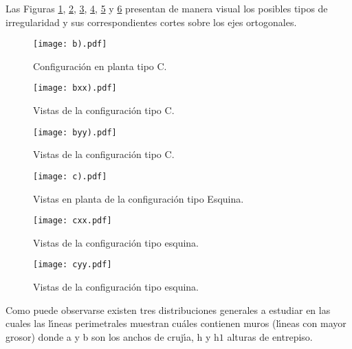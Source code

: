 Las Figuras \ref{fig:casosaf1}, \ref{fig:casosaf2}, \ref{fig:casosaf3}, \ref{fig:casosaf4}, \ref{fig:casosaf5} y \ref{fig:casosaf6} presentan de manera visual los posibles tipos de irregularidad y sus correspondientes cortes sobre los ejes ortogonales.  

\begin{figure} [htbp]
\centering
\texttt{[image: b).pdf]}
\caption{Configuraci\'on en planta tipo C.}
\label{fig:casosaf1}
\end{figure}

\begin{figure} [htbp]
\centering
\texttt{[image: bxx).pdf]}
\caption{Vistas de la configuraci\'on tipo C.}
\label{fig:casosaf2}
\end{figure}

\begin{figure} [htbp]
\centering
\texttt{[image: byy).pdf]}
\caption{Vistas de la configuraci\'on tipo C.}
\label{fig:casosaf3}
\end{figure}

\begin{figure} [htbp]
\centering
\texttt{[image: c).pdf]}
\caption{Vistas en planta de la configuraci\'on tipo Esquina.}
\label{fig:casosaf4}
\end{figure}

\begin{figure} [htbp]
\centering
\texttt{[image: cxx.pdf]}
\caption{Vistas de la configuraci\'on tipo esquina.}
\label{fig:casosaf5}
\end{figure}

\begin{figure} [htbp]
\centering
\texttt{[image: cyy.pdf]}
\caption{Vistas de la configuraci\'on tipo esquina.}
\label{fig:casosaf6}
\end{figure}

Como puede observarse existen tres distribuciones generales a estudiar en las cuales las l\'{\i}neas perimetrales muestran cu\'ales contienen muros (l\'{\i}neas con mayor grosor) donde a y b son los anchos de cruj\'{\i}a, h y h$1$ alturas de entrepiso. 


